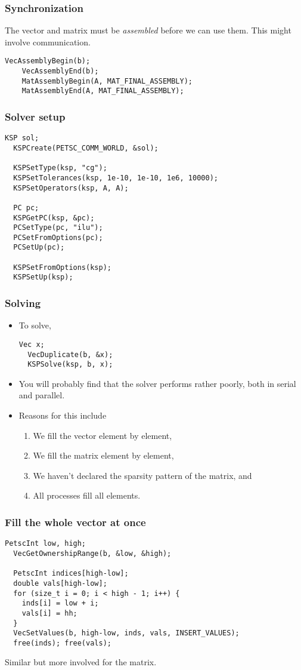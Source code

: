 \begin{frame}[fragile]
  \frametitle{Synchronization}
  The vector and matrix must be \emph{assembled} before we can use them. This
  might involve communication.
  \begin{lstlisting}[style=c]
    VecAssemblyBegin(b);
    VecAssemblyEnd(b);
    MatAssemblyBegin(A, MAT_FINAL_ASSEMBLY);
    MatAssemblyEnd(A, MAT_FINAL_ASSEMBLY);
  \end{lstlisting}
\end{frame}

\begin{frame}[fragile]
  \frametitle{Solver setup}
  \begin{lstlisting}[style=c]
  KSP sol;
  KSPCreate(PETSC_COMM_WORLD, &sol);

  KSPSetType(ksp, "cg");
  KSPSetTolerances(ksp, 1e-10, 1e-10, 1e6, 10000);
  KSPSetOperators(ksp, A, A);

  PC pc;
  KSPGetPC(ksp, &pc);
  PCSetType(pc, "ilu");
  PCSetFromOptions(pc);
  PCSetUp(pc);

  KSPSetFromOptions(ksp);
  KSPSetUp(ksp);
  \end{lstlisting}
\end{frame}

\begin{frame}[fragile]
  \frametitle{Solving}
  \begin{itemize}
  \item To solve,
    \begin{lstlisting}[style=c]
  Vec x;
  VecDuplicate(b, &x);
  KSPSolve(ksp, b, x);
    \end{lstlisting}
  \item You will probably find that the solver performs rather poorly, both in
    serial and parallel.
  \item Reasons for this include
    \begin{enumerate}
    \item We fill the vector element by element,
    \item We fill the matrix element by element,
    \item We haven't declared the sparsity pattern of the matrix, and
    \item All processes fill all elements.
    \end{enumerate}
  \end{itemize}
\end{frame}

\begin{frame}[fragile]
  \frametitle{Fill the whole vector at once}
  \begin{lstlisting}[style=c]
  PetscInt low, high;
  VecGetOwnershipRange(b, &low, &high);

  PetscInt indices[high-low];
  double vals[high-low];
  for (size_t i = 0; i < high - 1; i++) {
    inds[i] = low + i;
    vals[i] = hh;
  }
  VecSetValues(b, high-low, inds, vals, INSERT_VALUES);
  free(inds); free(vals);
  \end{lstlisting}
  Similar but more involved for the matrix.
\end{frame}


